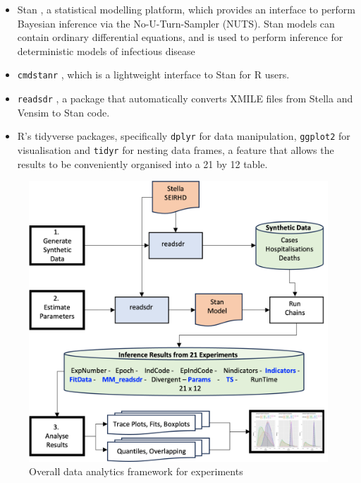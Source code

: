 \documentclass[10pt,letterpaper]{article}
\begin{document}
\begin{itemize}
\item
  Stan \citep{carpenter2017stan}, a statistical modelling platform, which provides an interface to perform Bayesian inference via the No-U-Turn-Sampler (NUTS). Stan models can contain ordinary differential equations, and is used to perform inference for deterministic models of infectious disease \citep{https://doi.org/10.1002/sdr.1693, ANDRADE2020100415, doi:10.1098/rsos.230515}
\item
  \texttt{cmdstanr} \citep{gabry2021cmdstanr}, which is a lightweight interface to Stan for R users.
\item
  \texttt{readsdr} \citep{andrade_readsdr}, a package that automatically converts XMILE ﬁles from Stella and Vensim to Stan code.
\item
  R's tidyverse packages, specifically \texttt{dplyr} for data manipulation, \texttt{ggplot2} for visualisation and \texttt{tidyr} for nesting data frames, a feature that allows the results to be conveniently organised into a 21 by 12 table.
\end{itemize}

\begin{figure}
\includegraphics[width=1\linewidth]{diagrams/sys_design} \caption{Overall data analytics framework for experiments}\label{fig:sys-design}
\end{figure}
\end{document}

